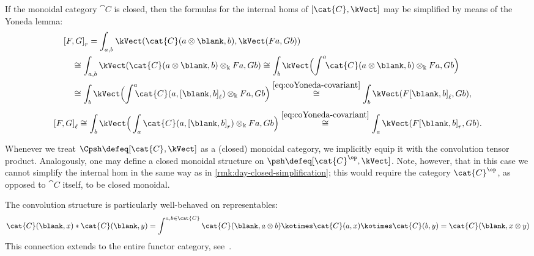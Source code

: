 \begin{remark}\label{rmk:day-closed-simplification}
  If the monoidal category \(\cat{C}\) is closed,
  then the formulas for the internal homs of \([\cat{C}, \kVect]\) may be simplified
  by means of the Yoneda lemma:
  \begin{equation}\label{eq:right-internal hom-simplification}
    \begin{aligned}
      &{[F,G]}_r
        = \int_{a,b} \kVect (\cat{C}(a \otimes \blank, b), \kVect(Fa, Gb)) \\
      &\quad \cong \int_{a, b} \kVect(\cat{C}(a \otimes \blank , b) \otimes_{\Bbbk}Fa, Gb)
        \cong \int_b \kVect\Big(\!\int^a\!\!\cat{C}(a \otimes \blank , b) \otimes_{\Bbbk}Fa , Gb\Big)\\
      &\quad \cong \int_b \kVect\Big(\!\int^a\!\!\!\cat{C}(a   ,{[\blank, b]}_{\ell}) \otimes_{\Bbbk}Fa , Gb\Big)
        \overset{\eqref{eq:coYoneda-covariant}}{\cong} \int_b \kVect(F{[\blank,b]}_{\ell}, Gb),
    \end{aligned}
  \end{equation}
  \begin{equation}\label{eq:left-internal hom-simplification}
    \begin{aligned}
      {[F,G]}_{\ell}
      \cong \int_b \kVect\Big(\int_a \cat{C}(a, {[\blank, b]}_r) \otimes_{\Bbbk}Fa , Gb\Big)
      \overset{\eqref{eq:coYoneda-covariant}}{\cong} \int_a \kVect(F{[\blank,b ]}_r, Gb).
    \end{aligned}
  \end{equation}
\end{remark}

\begin{remark}
  Whenever we treat \(\Cpsh \defeq [\cat{C}, \kVect]\) as a (closed) monoidal category,
  we implicitly equip it with the convolution tensor product.
  Analogously, one may define a closed monoidal structure on \(\psh \defeq [\cat{C}^{\op}, \kVect]\).
  Note, however, that in this case we cannot simplify the internal hom in the same way as in \cref{rmk:day-closed-simplification};
  this would require the category \(\cat{C}^{\op}\), as opposed to \(\cat{C}\) itself, to be closed monoidal.
\end{remark}

The convolution structure is particularly well-behaved on representables:
\[
  \cat{C}(\blank, x) * \cat{C}(\blank, y)
  = \int^{a, b \in \cat{C}} \cat{C}(\blank, a \otimes b) \kotimes \cat{C}(a, x) \kotimes \cat{C}(b, y)
  = \cat{C}(\blank, x \otimes y)
\]
This connection extends to the entire functor category, see~\cite{day71:const,im86:univ-conv}.

